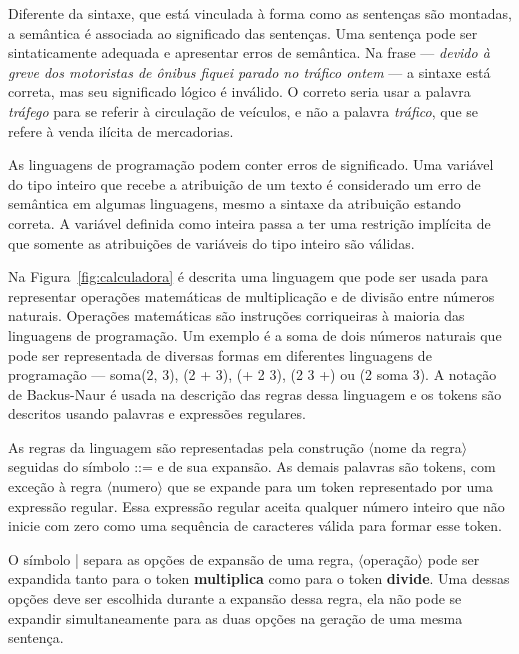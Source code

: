 Diferente da sintaxe, que está vinculada à forma como as sentenças são montadas, a semântica é associada ao significado das sentenças. Uma sentença pode ser sintaticamente adequada e apresentar erros de semântica. Na frase --- \textit{devido à greve dos motoristas de ônibus fiquei parado no tráfico ontem} --- a sintaxe está correta, mas seu significado lógico é inválido. O correto seria usar a palavra \textit{tráfego} para se referir à circulação de veículos, e não a palavra \textit{tráfico}, que se refere à venda ilícita de mercadorias. 

As linguagens de programação podem conter erros de significado. Uma variável do tipo inteiro que recebe a atribuição de um texto é considerado um erro de semântica em algumas linguagens, mesmo a sintaxe da atribuição estando correta. A variável definida como inteira passa a ter uma restrição implícita de que somente as atribuições de variáveis do tipo inteiro são válidas.

Na Figura~\ref{fig:calculadora} é descrita uma linguagem que pode ser usada para representar operações matemáticas de multiplicação e de divisão entre números naturais. Operações matemáticas são instruções corriqueiras à maioria das linguagens de programação. Um exemplo é a soma de dois números naturais que pode ser representada de diversas formas em diferentes linguagens de programação --- soma(2, 3), (2 + 3), (+ 2 3), (2 3 +) ou (2 soma 3). A notação de Backus-Naur é usada na descrição das regras dessa linguagem e os tokens são descritos usando palavras e expressões regulares.

As regras da linguagem são representadas pela construção $\langle$nome da regra$\rangle$ seguidas do símbolo ::= e de sua expansão. As demais palavras são tokens, com exceção à regra  $\langle$numero$\rangle$ que se expande para um token representado por uma expressão regular. Essa expressão regular aceita qualquer número inteiro que não inicie com zero como uma sequência de caracteres válida para formar esse token. 

O símbolo | separa as opções de expansão de uma regra, $\langle$operação$\rangle$ pode ser expandida tanto para o token \textbf{multiplica} como para o token \textbf{divide}. Uma dessas opções deve ser escolhida durante a expansão dessa regra, ela não pode se expandir simultaneamente para as duas opções na geração de uma mesma sentença.

